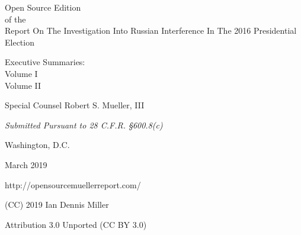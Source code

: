 \thispagestyle{empty}

\begin{center}
\Huge
Open Source Edition \\
of the \\
Report On The Investigation Into Russian Interference In The 2016 Presidential Election

\vspace{10 mm}

\large
Executive Summaries:\\
Volume I\\
Volume II

\vspace{10 mm}

Special Counsel Robert S. Mueller, III

\vspace{10 mm}

\normalsize

\textit{Submitted Pursuant to 28 C.F.R. \S 600.8(c)}

\vspace{20 mm}

Washington, D.C.

\vspace{10 mm}

March 2019

\vspace{10 mm}

\large
http://opensourcemuellerreport.com/

\vspace{10 mm}

\normalsize
(CC) 2019 Ian Dennis Miller

Attribution 3.0 Unported (CC BY 3.0)

\end{center}

\newpage

